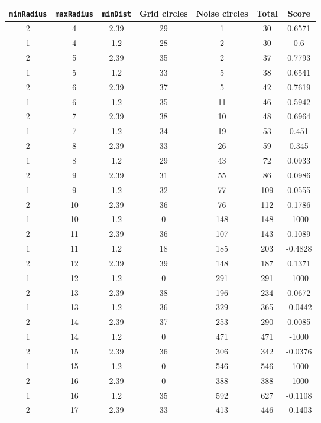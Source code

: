 \documentclass[letterpaper, 12pt]{article}
\begin{document}
\begin{longtable}{|c|c|c|c|c|c|c|}
\hline
\textbf{\texttt{minRadius}} & \textbf{\texttt{maxRadius}} & \textbf{\texttt{minDist}} & \textbf{Grid circles} & \textbf{Noise circles} & \textbf{Total} & \textbf{Score} \\
\hline
2 & 4 & 2.39 & 29 & 1 & 30 & 0.6571 \\
\hline
1 & 4 & 1.2 & 28 & 2 & 30 & 0.6 \\
\hline
2 & 5 & 2.39 & 35 & 2 & 37 & 0.7793 \\
\hline
1 & 5 & 1.2 & 33 & 5 & 38 & 0.6541 \\
\hline
2 & 6 & 2.39 & 37 & 5 & 42 & 0.7619 \\
\hline
1 & 6 & 1.2 & 35 & 11 & 46 & 0.5942 \\
\hline
2 & 7 & 2.39 & 38 & 10 & 48 & 0.6964 \\
\hline
1 & 7 & 1.2 & 34 & 19 & 53 & 0.451 \\
\hline
2 & 8 & 2.39 & 33 & 26 & 59 & 0.345 \\
\hline
1 & 8 & 1.2 & 29 & 43 & 72 & 0.0933 \\
\hline
2 & 9 & 2.39 & 31 & 55 & 86 & 0.0986 \\
\hline
1 & 9 & 1.2 & 32 & 77 & 109 & 0.0555 \\
\hline
2 & 10 & 2.39 & 36 & 76 & 112 & 0.1786 \\
\hline
1 & 10 & 1.2 & 0 & 148 & 148 & -1000 \\
\hline
2 & 11 & 2.39 & 36 & 107 & 143 & 0.1089 \\
\hline
1 & 11 & 1.2 & 18 & 185 & 203 & -0.4828 \\
\hline
2 & 12 & 2.39 & 39 & 148 & 187 & 0.1371 \\
\hline
1 & 12 & 1.2 & 0 & 291 & 291 & -1000 \\
\hline
2 & 13 & 2.39 & 38 & 196 & 234 & 0.0672 \\
\hline
1 & 13 & 1.2 & 36 & 329 & 365 & -0.0442 \\
\hline
2 & 14 & 2.39 & 37 & 253 & 290 & 0.0085 \\
\hline
1 & 14 & 1.2 & 0 & 471 & 471 & -1000 \\
\hline
2 & 15 & 2.39 & 36 & 306 & 342 & -0.0376 \\
\hline
1 & 15 & 1.2 & 0 & 546 & 546 & -1000 \\
\hline
2 & 16 & 2.39 & 0 & 388 & 388 & -1000 \\
\hline
1 & 16 & 1.2 & 35 & 592 & 627 & -0.1108 \\
\hline
2 & 17 & 2.39 & 33 & 413 & 446 & -0.1403 \\

\end{longtable}
\end{document}

